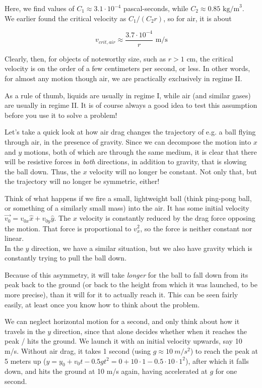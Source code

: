 \documentclass[12pt,a4paper]{report}
\begin{document}
Here, we find values of $C_1 \approx 3.1 \cdot 10^{-4}$ pascal-seconds, while $C_2 \approx 0.85 \text{ kg/m}^3$.\\
We earlier found the critical velocity as $C_1/(C_2 r)$, so for air, it is about 

\begin{equation}
v_{crit,air} \approx \frac{3.7 \cdot 10^{-4}}{r} \text{ m/s}
\end{equation}

Clearly, then, for objects of noteworthy size, such as $r > 1$ cm, the critical velocity is on the order of a few centimeters per second, or less. In other words, for almost any motion though air, we are practically exclusively in regime II.

As a rule of thumb, liquids are usually in regime I, while air (and similar gases) are usually in regime II. It is of course always a good idea to test this assumption before you use it to solve a problem!

Let's take a quick look at how air drag changes the trajectory of e.g. a ball flying through air, in the presence of gravity. Since we can decompose the motion into $x$ and $y$ motions, both of which are through the same medium, it is clear that there will be resistive forces in \emph{both} directions, in addition to gravity, that is slowing the ball down. Thus, the $x$ velocity will no longer be constant. Not only that, but the trajectory will no longer be symmetric, either!

Think of what happens if we fire a small, lightweight ball (think ping-pong ball, or something of a similarly small mass) into the air. It has some initial velocity $\vec{v_0} = v_{0x} \hat{x} + v_{0y} \hat{y}$. The $x$ velocity is constantly reduced by the drag force opposing the motion. That force is proportional to $v_x^2$, so the force is neither constant nor linear.\\
In the $y$ direction, we have a similar situation, but we also have gravity which is constantly trying to pull the ball down.

Because of this asymmetry, it will take \emph{longer} for the ball to fall down from its peak back to the ground (or back to the height from which it was launched, to be more precise), than it will for it to actually reach it. This can be seen fairly easily, at least once you know how to think about the problem.

We can neglect horizontal motion for a second, and only think about how it travels in the $y$ direction, since that alone decides whether when it reaches the peak / hits the ground. We launch it with an initial velocity upwards, say 10 m/s. Without air drag, it takes 1 second (using $g \approx \SI{10}{m/s^2}$) to reach the peak at 5 meters up ($y = y_0 + v_0t - 0.5 g t^2 = 0 + 10\cdot1 - 0.5\cdot10\cdot1^2$), after which it falls down, and hits the ground at 10 m/s again, having accelerated at $g$ for one second.
\end{document}
